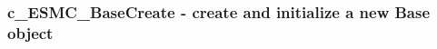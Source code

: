  
\setlength{\oldparskip}{\parskip}
\setlength{\parskip}{1.5ex}
\setlength{\oldparindent}{\parindent}
\setlength{\parindent}{0pt}
\setlength{\oldbaselineskip}{\baselineskip}
\setlength{\baselineskip}{11pt}
 
\def\bv{\begin{verbatim}}
\def\ev{\end{verbatim}}
\def\be{\begin{equation}}
\def\ee{\end{equation}}
\def\bea{\begin{eqnarray}}
\def\eea{\end{eqnarray}}
\def\bi{\begin{itemize}}
\def\ei{\end{itemize}}
\def\bn{\begin{enumerate}}
\def\en{\end{enumerate}}
\def\bd{\begin{description}}
\def\ed{\end{description}}
\def\({\left (}
\def\){\right )}
\def\[{\left [}
\def\]{\right ]}
\def\<{\left  \langle}
\def\>{\right \rangle}
\def\cI{{\cal I}}
\def\diag{\mathop{\rm diag}}
\def\tr{\mathop{\rm tr}}


 
\subsubsection [c\_ESMC\_BaseCreate] {c\_ESMC\_BaseCreate - create and initialize a new Base object }


